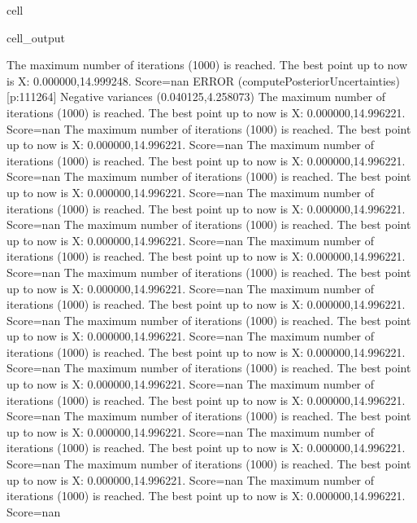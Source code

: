 \documentclass[letterpaper,10pt,english]{jupyterBook}
\begin{document}
\begin{sphinxuseclass}{cell}
\begin{sphinxVerbatimOutput}
\begin{sphinxuseclass}{cell_output}
\begin{sphinxVerbatim}[commandchars=\\\{\}]
The maximum number of iterations (1000) is reached. The best point up to now is X: \PYGZob{}0.000000,14.999248\PYGZcb{}. Score=\PYGZhy{}nan
ERROR (compute\PYGZus{}Posterior\PYGZus{}Uncertainties) [p:111264] Negative variances (\PYGZhy{}0.040125,4.258073)
The maximum number of iterations (1000) is reached. The best point up to now is X: \PYGZob{}0.000000,14.996221\PYGZcb{}. Score=\PYGZhy{}nan
The maximum number of iterations (1000) is reached. The best point up to now is X: \PYGZob{}0.000000,14.996221\PYGZcb{}. Score=\PYGZhy{}nan
The maximum number of iterations (1000) is reached. The best point up to now is X: \PYGZob{}0.000000,14.996221\PYGZcb{}. Score=\PYGZhy{}nan
The maximum number of iterations (1000) is reached. The best point up to now is X: \PYGZob{}0.000000,14.996221\PYGZcb{}. Score=\PYGZhy{}nan
The maximum number of iterations (1000) is reached. The best point up to now is X: \PYGZob{}0.000000,14.996221\PYGZcb{}. Score=\PYGZhy{}nan
The maximum number of iterations (1000) is reached. The best point up to now is X: \PYGZob{}0.000000,14.996221\PYGZcb{}. Score=\PYGZhy{}nan
The maximum number of iterations (1000) is reached. The best point up to now is X: \PYGZob{}0.000000,14.996221\PYGZcb{}. Score=\PYGZhy{}nan
The maximum number of iterations (1000) is reached. The best point up to now is X: \PYGZob{}0.000000,14.996221\PYGZcb{}. Score=\PYGZhy{}nan
The maximum number of iterations (1000) is reached. The best point up to now is X: \PYGZob{}0.000000,14.996221\PYGZcb{}. Score=\PYGZhy{}nan
The maximum number of iterations (1000) is reached. The best point up to now is X: \PYGZob{}0.000000,14.996221\PYGZcb{}. Score=\PYGZhy{}nan
The maximum number of iterations (1000) is reached. The best point up to now is X: \PYGZob{}0.000000,14.996221\PYGZcb{}. Score=\PYGZhy{}nan
The maximum number of iterations (1000) is reached. The best point up to now is X: \PYGZob{}0.000000,14.996221\PYGZcb{}. Score=\PYGZhy{}nan
The maximum number of iterations (1000) is reached. The best point up to now is X: \PYGZob{}0.000000,14.996221\PYGZcb{}. Score=\PYGZhy{}nan
The maximum number of iterations (1000) is reached. The best point up to now is X: \PYGZob{}0.000000,14.996221\PYGZcb{}. Score=\PYGZhy{}nan
The maximum number of iterations (1000) is reached. The best point up to now is X: \PYGZob{}0.000000,14.996221\PYGZcb{}. Score=\PYGZhy{}nan
The maximum number of iterations (1000) is reached. The best point up to now is X: \PYGZob{}0.000000,14.996221\PYGZcb{}. Score=\PYGZhy{}nan
The maximum number of iterations (1000) is reached. The best point up to now is X: \PYGZob{}0.000000,14.996221\PYGZcb{}. Score=\PYGZhy{}nan

\end{sphinxVerbatim}
\end{sphinxuseclass}
\end{sphinxVerbatimOutput}
\end{sphinxuseclass}
\end{document}
